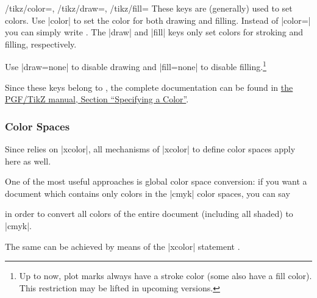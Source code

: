 \begin{keylist}{
    /tikz/color=,
    /tikz/draw=,
    /tikz/fill=%
}
    These keys are (generally) used to set colors. Use |color| to set the color
    for both drawing and filling. Instead of |color=| you can
    simply write . The |draw| and |fill| keys only set colors
    for stroking and filling, respectively.

    Use |draw=none| to disable drawing and |fill=none| to disable
    filling.\footnote{Up to now, plot marks always have a stroke color (some
    also have a fill color). This restriction may be lifted in upcoming
    versions.}

    Since these keys belong to \Tikz{}, the complete documentation can be found
    in \href{https://tikz.dev/tikz-actions#sec-15.2}{the PGF/TikZ manual, Section ``Specifying a Color''}.
\end{keylist}


\subsubsection{Color Spaces}

Since \PGFPlots{} relies on |xcolor|, all mechanisms of |xcolor| to define
color spaces apply here as well.

One of the most useful approaches is global color space conversion: if you want
a document which contains only colors in the |cmyk| color spaces, you can say

\begin{codeexample}
\usepackage[cmyk]{xcolor}
\usepackage{pgfplots}
\end{codeexample}
%
\noindent in order to convert all colors of the entire document (including all
shaded) to |cmyk|.

The same can be achieved by means of the |xcolor| statement
\declareandlabel{\selectcolormodel}.
%
\begin{codeexample}
\end{codeexample}


